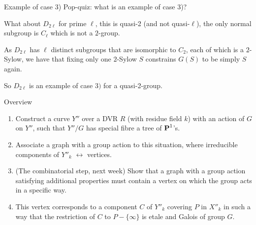 \begin{frame}{Example of case 3)}
    Pop-quiz: what is an example of case 3)?\pause

    What about $D_{2\ell}$ for prime $\ell$, this is quasi-2 (and not quasi-$\ell$), the only normal subgroup is $C_\ell$ which is not a $2$-group.

    As $D_{2\ell}$ has $\ell$ distinct subgroups that are isomorphic to $C_2$, each of which is a $2$-Sylow, we have that fixing only one $2$-Sylow $S$ constrains $G(S)$ to be simply $S$ again.

    So $D_{2\ell}$ is an example of case $3)$ for a quasi-2-group.


\end{frame}

\begin{frame}{Overview}
    \begin{enumerate}[<+->]
        \item Construct a curve $Y''$ over a DVR $R$ (with residue field $k$) with an action of $G$ on $Y''$, such that $Y''/G$ has special fibre a tree of $\operatorname{\mathbf {P}}^1$'s.
        \item Associate a graph with a group action to this situation, where irreducible components of $Y''_k$ $\leftrightarrow$ vertices.
        \item (The combinatorial step, next week) Show that a graph with a group action satisfying additional properties must contain a vertex on which the group acts in a specific way.
        \item This vertex corresponds to a component $C$ of $Y''_k$ covering $P$ in $X''_k$ in such a way that the restriction of $C$ to $P - \{ \infty \}$ is etale and Galois of group $G$.
    \end{enumerate}
\end{frame}

